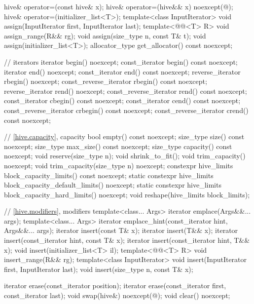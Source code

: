 \begin{codeblock}
{{    hive& operator=(const hive& x);
    hive& operator=(hive&& x) noexcept(@\seebelow@);
    hive& operator=(initializer_list<T>);
    template<class InputIterator>
      void assign(InputIterator first, InputIterator last);
    template<@@<T> R>
      void assign_range(R&& rg);
    void assign(size_type n, const T& t);
    void assign(initializer_list<T>);
    allocator_type get_allocator() const noexcept;

    // iterators
    iterator                begin() noexcept;
    const_iterator          begin() const noexcept;
    iterator                end() noexcept;
    const_iterator          end() const noexcept;
    reverse_iterator        rbegin() noexcept;
    const_reverse_iterator  rbegin() const noexcept;
    reverse_iterator        rend() noexcept;
    const_reverse_iterator  rend() const noexcept;
    const_iterator          cbegin() const noexcept;
    const_iterator          cend() const noexcept;
    const_reverse_iterator  crbegin() const noexcept;
    const_reverse_iterator  crend() const noexcept;

    // \ref{hive.capacity}, capacity
    bool empty() const noexcept;
    size_type size() const noexcept;
    size_type max_size() const noexcept;
    size_type capacity() const noexcept;
    void reserve(size_type n);
    void shrink_to_fit();
    void trim_capacity() noexcept;
    void trim_capacity(size_type n) noexcept;
    constexpr hive_limits block_capacity_limits() const noexcept;
    static constexpr hive_limits block_capacity_default_limits() noexcept;
    static constexpr hive_limits block_capacity_hard_limits() noexcept;
    void reshape(hive_limits block_limits);

    // \ref{hive.modifiers}, modifiers
    template<class... Args> iterator emplace(Args&&... args);
    template<class... Args> iterator emplace_hint(const_iterator hint, Args&&... args);
    iterator insert(const T& x);
    iterator insert(T&& x);
    iterator insert(const_iterator hint, const T& x);
    iterator insert(const_iterator hint, T&& x);
    void insert(initializer_list<T> il);
    template<@@<T> R>
      void insert_range(R&& rg);
    template<class InputIterator>
      void insert(InputIterator first, InputIterator last);
    void insert(size_type n, const T& x);

    iterator erase(const_iterator position);
    iterator erase(const_iterator first, const_iterator last);
    void swap(hive&) noexcept(@\seebelow@);
    void clear() noexcept;

}}
\end{codeblock}
